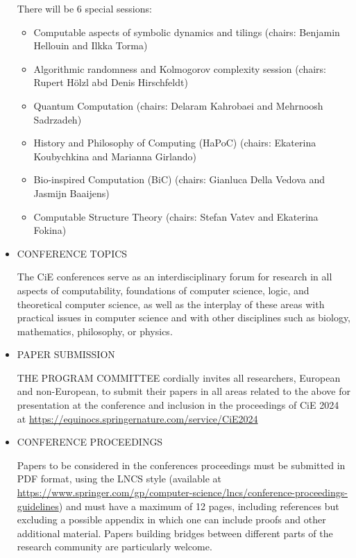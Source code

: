 \documentclass[prodmode,acmtecs]{acmsmall} %
\begin{document}
\begin{itemize}
  There will be 6 special sessions: 
 
\begin{itemize}\item  Computable aspects of symbolic dynamics and tilings (chairs: Benjamin Hellouin and Ilkka Torma)
\item  Algorithmic randomness and Kolmogorov complexity session (chairs: Rupert Hölzl abd Denis Hirschfeldt)
\item  Quantum Computation (chairs: Delaram Kahrobaei and Mehrnoosh Sadrzadeh)
\item  History and Philosophy of Computing (HaPoC) (chairs: Ekaterina Koubychkina and Marianna Girlando)
\item  Bio-inspired Computation (BiC) (chairs: Gianluca Della Vedova and Jasmijn Baaijens)
\item  Computable Structure Theory (chairs: Stefan Vatev and Ekaterina Fokina)
\end{itemize} 
\item  CONFERENCE TOPICS 
 
  The CiE conferences serve as an interdisciplinary forum for research in all aspects of computability, foundations of computer science, logic, and theoretical computer science, as well as the interplay of these areas with practical issues in computer science and with other disciplines such as biology, mathematics, philosophy, or physics. 
 
\item  PAPER SUBMISSION 
 
  THE PROGRAM COMMITTEE cordially invites all researchers, European and non-European, to submit their papers in all areas related to the above for presentation at the conference and inclusion in the proceedings of CiE 2024 at \href{https://equinocs.springernature.com/service/CiE2024}{https://equinocs.springernature.com/service/CiE2024} 
 
\item  CONFERENCE PROCEEDINGS 
 
  Papers to be considered in the conferences proceedings must be submitted in PDF format, using the LNCS style (available at \href{https://www.springer.com/gp/computer-science/lncs/conference-proceedings-guidelines}{https://www.springer.com/gp/computer-science/lncs/conference-proceedings-guidelines}) and must have a maximum of 12 pages, including references but excluding a possible appendix in which one can include proofs and other additional material. Papers building bridges between different parts of the research community are particularly welcome. 
 

\end{itemize}
\end{document}
